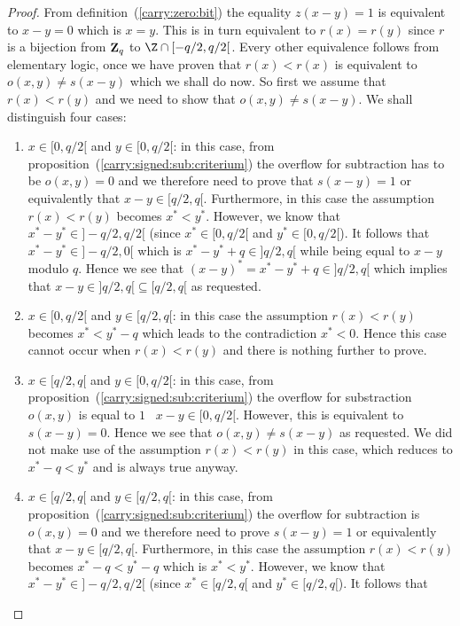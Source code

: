 \documentclass{article}
\newcommand{\zq}{\mbox{${\bf Z}_{q}$}}
\begin{document}
\begin{proof}
  From definition~(\ref{carry:zero:bit}) the equality $z(x-y)=1$ is equivalent
  to $x-y=0$ which is $x=y$. This is in turn equivalent to $r(x)=r(y)$ since
  $r$ is a bijection from $\zq$ to $\Z\cap[-q/2,q/2[$. Every other equivalence
  follows from elementary logic, once we have proven that $r(x)<r(x)$ is
  equivalent to $o(x,y)\neq s(x-y)$ which we shall do now. So first we 
  assume that $r(x)<r(y)$ and we need to show that $o(x,y)\neq s(x-y)$.
  We shall distinguish four cases:
  \begin{enumerate}
    \item $x\in[0,q/2[$ and $y\in[0,q/2[$: in this case, from 
      proposition~(\ref{carry:signed:sub:criterium}) the overflow for
      subtraction has to be $o(x,y)=0$ and we therefore need to prove
      that $s(x-y)=1$ or equivalently that $x-y\in[q/2,q[$. Furthermore,
      in this case the assumption $r(x)<r(y)$ becomes $x^{*}<y^{*}$.
      However, we know that $x^{*}-y^{*}\in]-q/2,q/2[$ (since 
      $x^{*}\in[0,q/2[$ and $y^{*}\in[0,q/2[$). It follows that
      $x^{*}-y^{*}\in]-q/2,0[$ which is $x^{*}-y^{*}+q\in]q/2,q[$
      while being equal to $x-y$ modulo $q$. Hence we see that
      $(x-y)^{*}=x^{*}-y^{*}+q\in]q/2,q[$ which implies that
      $x-y\in]q/2,q[\subseteq[q/2,q[$ as requested.
    \item $x\in[0,q/2[$ and $y\in[q/2,q[$: in this case the assumption 
      $r(x)<r(y)$ becomes $x^{*}<y^{*}-q$ which leads to the
      contradiction $x^{*}<0$. Hence this case cannot occur 
      when $r(x)<r(y)$ and there is nothing further to prove.
    \item $x\in[q/2,q[$ and $y\in[0,q/2[$: in this case, from
      proposition~(\ref{carry:signed:sub:criterium}) the overflow
      for substraction $o(x,y)$ is equal to $1$ \ifand\ $x-y\in[0,q/2[$.
      However, this is equivalent to $s(x-y)=0$. Hence we see that
      $o(x,y)\neq s(x-y)$ as requested. We did not make use of the 
      assumption $r(x)<r(y)$ in this case, which reduces to 
      $x^{*}-q < y^{*}$ and is always true anyway. 
    \item $x\in[q/2,q[$ and $y\in[q/2,q[$: in this case, from
      proposition~(\ref{carry:signed:sub:criterium}) the overflow for 
      subtraction is $o(x,y)=0$ and we therefore need to prove 
      $s(x-y)=1$ or equivalently that $x-y\in[q/2,q[$. Furthermore,
      in this case the assumption $r(x)<r(y)$ becomes $x^{*}-q<y^{*}-q$
      which is $x^{*}<y^{*}$. However, we know that $x^{*}-y^{*}\in]-q/2,q/2[$
      (since $x^{*}\in[q/2,q[$ and $y^{*}\in[q/2,q[$). It follows that

\end{enumerate}
\end{proof}
\end{document}
